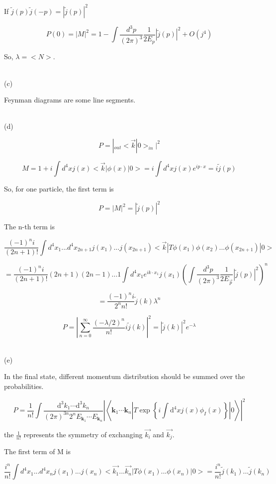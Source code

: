 \documentclass[11pt]{article} %
\begin{document}
If $\tilde{j}(p) \tilde{j}(-p) = |\tilde{j}(p)|^2$

\[
    P(0) = |M|^2 = 1 - \int \frac{d^3 p}{(2\pi)^3} \frac{1}{2 E_p} |\tilde{j}(p)|^2 + O(j^4)    
\]

So, $\lambda = <N>$.

~\\
\noindent (c)

Feynman diagrams are some line segments.

~\\
\noindent (d)

\[
    P = | _{out}<\vec{k}|0>_{in}|^2
\]

\[
    M = 1 + i \int d^4 x j(x) <\vec{k}|\phi(x)|0> = i \int d^4 x j(x) e^{ip \cdot x} = i \tilde{j}(p)    
\]

So, for one particle, the first term is

\[
    P = |M|^2 = |\tilde{j}(p)|^2    
\]

The n-th term is

\[
    \frac{(-1)^n i}{(2n+1)!} \int d^4 x_1 ... d^4 x_{2n+1} j(x_1)... j(x_{2n+1}) <\vec{k}|T\phi(x_1)\phi(x_2)...\phi(x_{2n+1})|0>    
\]

\[
    = \frac{(-1)^n i}{(2n+1)!} (2n+1)(2n-1)...1 \int d^4 x_1 e^{ik\cdot x_1} j(x_1) (\int \frac{d^3 p}{(2\pi)^3} \frac{1}{2 E_{\vec{p}}} |\tilde{j}(p)|^2)^n     
\]

\[
    = \frac{(-1)^n i}{2^n n!} \tilde{j}(k) \lambda^n    
\]

\[
    P = \left|\sum_{n=0}^{\infty} \frac{(-\lambda / 2)^{n}}{n !} i \tilde{j}(k) \right|^{2} = |\tilde{j}(k)|^2 e^{-\lambda}    
\]

~\\
\noindent (e)

In the final state, different momentum distribution should be summed over the probabilities.

\[
    P = \frac{1}{n!} \int \frac{\mathrm{d}^{3} k_{1} \cdots \mathrm{d}^{3} k_{n}}{(2 \pi)^{3 n} 2^{n} E_{\mathbf{k}_{1}} \cdots E_{\mathbf{k}_{n}}} |\left\langle\mathbf{k}_{1} \cdots \mathbf{k}_{n}\left|T \exp \left\{i \int \mathrm{d}^{4} x j(x) \phi_{I}(x)\right\}\right| 0\right\rangle |^2    
\]

the $\frac{1}{n!}$ represents the symmetry of exchanging $\vec{k_i}$ and $\vec{k_j}$. 

The first term of M is 

\[
    \frac{i^n}{n!} \int d^4 x_1 ... d^4 x_n j(x_1) ... j(x_n) <\vec{k_1}...\vec{k_n}|T\phi(x_1)...\phi(x_n)|0> = \frac{i^n}{n!} \tilde{j}(k_1) ... \tilde{j}(k_n)
\]
\end{document}
